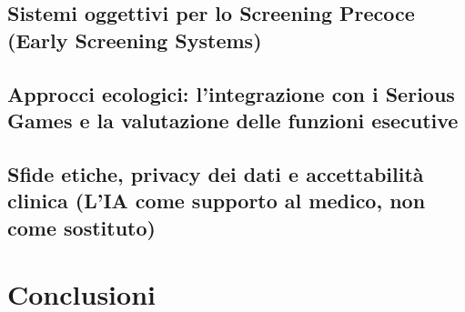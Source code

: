 \documentclass[12pt,a4paper,twoside]{book}
\begin{document}
\section{Sistemi oggettivi per lo Screening Precoce (Early Screening Systems)}
\section{Approcci ecologici: l'integrazione con i Serious Games e la valutazione delle funzioni esecutive}
\section{Sfide etiche, privacy dei dati e accettabilità clinica (L'IA come supporto al medico, non come sostituto)}
\chapter{Conclusioni}
\end{document}
